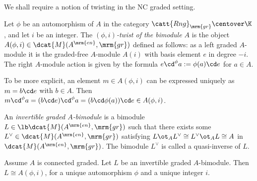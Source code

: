 We shall require a notion of twisting in the NC graded setting. 

\begin{dfn} \label{dfn:3780}
Let $\phi$ be an automorphism of $A$ in the category 
$\catt{Rng}_{\mrm{gr}} \centover \K$, and let $i$ be an integer. 
The {\em $(\phi, i)$-twist of the bimodule $A$}%
%
is the object
$A(\phi, i) \in \dcat{M}(A^{\mrm{en}}, \mrm{gr})$
defined as follows: as a left graded $A$-module it is the graded-free 
$A$-module $A(i)$ with basis element $e$ in degree $-i$. The right $A$-module 
action is given by the formula 
$e \cd^{\phi} a := \phi(a) \cd e$ for $a \in A$. 
\end{dfn}

To be more explicit, an element $m \in A(\phi, i)$ can be expressed uniquely as 
$m = b \cd e$ with $b \in A$. Then 
$m \cd^{\phi} a = (b \cd e) \cd^{\phi} a = (b \cd \phi(a)) \cd e 
\in A(\phi, i)$.

\begin{dfn} \label{dfn:3925}
An {\em invertible graded $A$-bimodule} is a bimodule 
$L \in \lb \dcat{M}(A^{\mrm{en}}, \mrm{gr})$
such that there exists some 
$L^{\vee} \in \dcat{M}(A^{\mrm{en}}, \mrm{gr})$
satisfying 
$L \ot_A L^{\vee} \cong L^{\vee} \ot_A L \cong A$
in $\dcat{M}(A^{\mrm{en}}, \mrm{gr})$.
The bimodule $L^{\vee}$ is called a quasi-inverse of $L$. 
\end{dfn}

\begin{prop} \label{prop:9325}  
Assume $A$ is connected graded. 
Let $L$ be an invertible graded $A$-bimodule.
Then $L \cong A(\phi, i)$, for a unique automorphism $\phi$ and a unique 
integer $i$. 
\end{prop}


